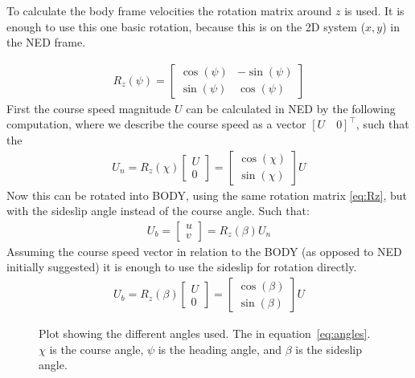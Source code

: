 To calculate the body frame velocities the rotation matrix around $z$ is used. It is enough to use this one basic rotation, because this is on the 2D system ($x,y$) in the \ac{NED} frame.

\begin{align}
R_{z} (\psi) =
\begin{bmatrix}
\cos(\psi) & -\sin(\psi)\\
\sin(\psi) & \cos(\psi)
\end{bmatrix}
\label{eq:Rz}
\end{align}
First the course speed magnitude $U$ can be calculated in \ac{NED} by the following computation, where we describe the course speed as a vector $[U\quad 0]^\top$, such that the 
\begin{align}
U_n = R_{z} (\chi)
\begin{bmatrix}
U \\ 0 
\end{bmatrix}
=
\begin{bmatrix}
\cos(\chi) \\
\sin(\chi)
\end{bmatrix}
U
\end{align}
Now this can be rotated into \ac{BODY}, using the same rotation matrix \vref{eq:Rz}, but with the sideslip angle instead of the course angle. Such that:
\begin{align}
U_b = \begin{bmatrix}
u \\ v
\end{bmatrix}
= R_z (\beta) U_n
\end{align}
Assuming the course speed vector in relation to the \ac{BODY} (as opposed to \ac{NED} initially suggested) it is enough to use the sideslip for rotation directly.
\begin{align}
U_b = R_{z} (\beta)
\begin{bmatrix}
U \\ 0 
\end{bmatrix}
=
\begin{bmatrix}
\cos(\beta) \\
\sin(\beta)
\end{bmatrix}
U
\end{align}

\begin{figure}[htbp]
	\centering
	
	\caption{Plot showing the different angles used. The in
		equation~\vref{eq:angles}. $\chi$ is the course angle, $\psi$ is
	the heading angle, and $\beta$ is the sideslip angle.}
	\label{fig:natical_angles}
\end{figure}


